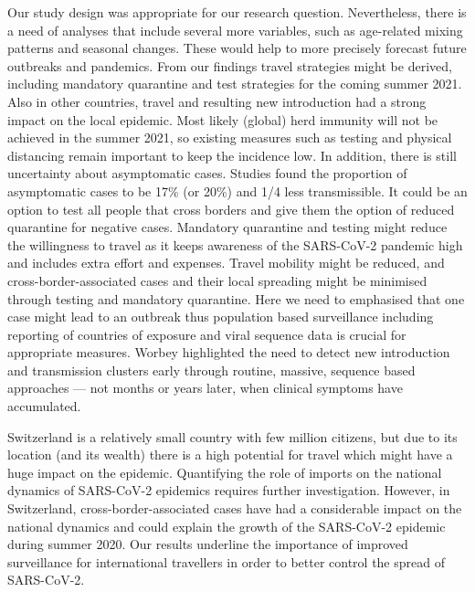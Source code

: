 \documentclass[10pt, a4paper, twoside]{article}
\begin{document}
\begin{multicols}{2}
Our study design was appropriate for our research question.
Nevertheless, there is a need of analyses that include several more variables, such as age-related mixing patterns and seasonal changes.
These would help to more precisely forecast future outbreaks and pandemics.
From our findings travel strategies might be derived, including mandatory quarantine and test strategies for the coming summer 2021.
Also in other countries, travel and resulting new introduction had a strong impact on the local epidemic.\cite{worobey_emergence_2020,russell_effect_2021,hodcroft_emergence_2020}
Most likely (global) herd immunity will not be achieved in the summer 2021, so existing measures such as testing and physical distancing remain important to keep the incidence low.
In addition, there is still uncertainty about asymptomatic cases.\cite{nogrady_what_2020,buitrago-garcia_occurrence_2020}
Studies found the proportion of asymptomatic cases to be 17\% (or 20\%) and 1/4 less transmissible.\cite{byambasuren_estimating_2020,buitrago-garcia_occurrence_2020,bi_household_2020}
It could be an option to test all people that cross borders and give them the option of reduced quarantine for negative cases.\cite{ashcroft_quantifying_2021}
Mandatory quarantine and testing might reduce the willingness to travel as it keeps awareness of the SARS-CoV-2 pandemic high and includes extra effort and expenses.
Travel mobility might be reduced, and cross-border-associated cases and their local spreading might be minimised through testing and mandatory quarantine.
Here we need to emphasised that one case might lead to an outbreak thus population based surveillance including reporting of countries of exposure and viral sequence data is crucial for appropriate measures.\cite{worobey_emergence_2020}
Worbey highlighted the need to detect new introduction and transmission clusters early through routine, massive, sequence based approaches — not months or years later, when clinical symptoms have accumulated.\cite{worobey_emergence_2020}

Switzerland is a relatively small country with few million citizens, but due to its location (and its wealth) there is a high potential for travel which might have a huge impact on the epidemic.
Quantifying the role of imports on the national dynamics of SARS-CoV-2 epidemics requires further investigation.
However, in Switzerland, cross-border-associated cases have had a considerable impact on the national dynamics and could explain the growth of the SARS-CoV-2 epidemic during summer 2020.
Our results underline the importance of improved surveillance for international travellers in order to better control the spread of SARS-CoV-2.



\end{multicols}
\end{document}
